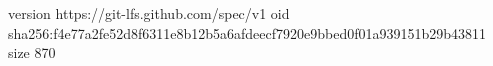 version https://git-lfs.github.com/spec/v1
oid sha256:f4e77a2fe52d8f6311e8b12b5a6afdeecf7920e9bbed0f01a939151b29b43811
size 870

